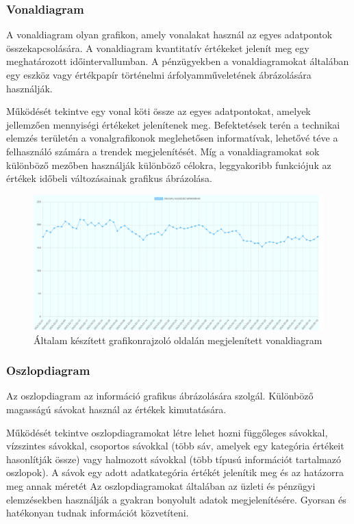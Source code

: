 \subsubsection{Vonaldiagram}

A vonaldiagram olyan grafikon, amely vonalakat használ az egyes adatpontok összekapcsolására. A vonaldiagram kvantitatív értékeket jelenít meg egy meghatározott időintervallumban. A pénzügyekben a vonaldiagramokat általában egy eszköz vagy értékpapír történelmi árfolyamműveletének ábrázolására használják. 

	Működését tekintve egy vonal köti össze az egyes adatpontokat, amelyek jellemzően mennyiségi értékeket jelenítenek meg. Befektetések terén a technikai elemzés területén a vonalgrafikonok meglehetősen informatívak, lehetővé téve a felhasználó számára a trendek megjelenítését. Míg a vonaldiagramokat sok különböző mezőben használják különböző célokra, leggyakoribb funkciójuk az értékek időbeli változásainak grafikus ábrázolása.

\begin{figure}[h]
\centering
\includegraphics[scale=0.3]{images/lineChartExample}
\caption{Általam készített grafikonrajzoló oldalán megjelenített vonaldiagram}
\end{figure}

\subsubsection{Oszlopdiagram}

Az oszlopdiagram az információ grafikus ábrázolására szolgál. Különböző magasságú sávokat használ az értékek kimutatására. 

	Működését tekintve oszlopdiagramokat létre lehet hozni függőleges sávokkal, vízszintes sávokkal, csoportos sávokkal (több sáv, amelyek egy kategória értékeit hasonlítják össze) vagy halmozott sávokkal (több típusú információt tartalmazó oszlopok). A sávok egy adott adatkategória értékét jelenítik meg és az hatázorra meg annak méretét Az oszlopdiagramokat általában az üzleti és pénzügyi elemzésekben használják a gyakran bonyolult adatok megjelenítésére. Gyorsan és hatékonyan tudnak információt közvetíteni.

